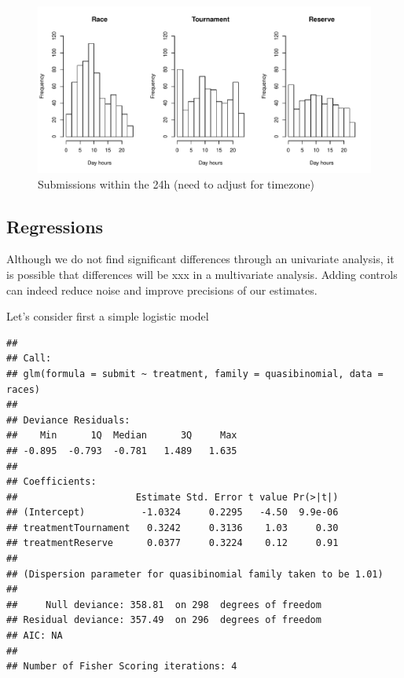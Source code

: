 \documentclass[12pt,]{article}
\begin{document}
\begin{figure}
\centering
\includegraphics{Figures/unnamed-chunk-18-1.pdf}
\caption{Submissions within the 24h (need to adjust for timezone)}
\end{figure}

\subsection{Regressions}\label{regressions}

Although we do not find significant differences through an univariate
analysis, it is possible that differences will be xxx in a multivariate
analysis. Adding controls can indeed reduce noise and improve precisions
of our estimates.

Let's consider first a simple logistic model

\begin{verbatim}
## 
## Call:
## glm(formula = submit ~ treatment, family = quasibinomial, data = races)
## 
## Deviance Residuals: 
##    Min      1Q  Median      3Q     Max  
## -0.895  -0.793  -0.781   1.489   1.635  
## 
## Coefficients:
##                     Estimate Std. Error t value Pr(>|t|)
## (Intercept)          -1.0324     0.2295   -4.50  9.9e-06
## treatmentTournament   0.3242     0.3136    1.03     0.30
## treatmentReserve      0.0377     0.3224    0.12     0.91
## 
## (Dispersion parameter for quasibinomial family taken to be 1.01)
## 
##     Null deviance: 358.81  on 298  degrees of freedom
## Residual deviance: 357.49  on 296  degrees of freedom
## AIC: NA
## 
## Number of Fisher Scoring iterations: 4
\end{verbatim}
\end{document}
